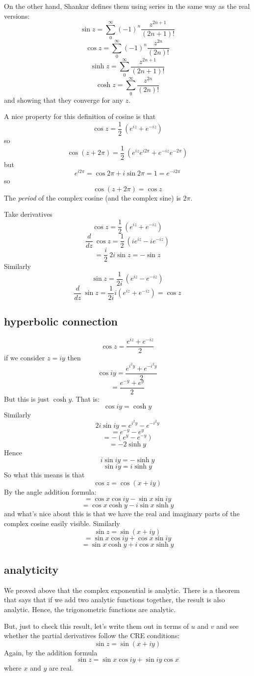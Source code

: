 \documentclass[11pt, oneside]{article}   	%
\begin{document}
On the other hand, Shankar defines them using series in the same way as the real versions:
\[ \sin z = \sum_0^{\infty} (-1)^n \frac{z^{2n+1}}{(2n +1)!} \]
\[ \cos z = \sum_0^{\infty} (-1)^n \frac{z^{2n}}{(2n)!} \]
\[ \sinh z = \sum_0^{\infty} \frac{z^{2n+1}}{(2n +1)!} \]
\[ \cosh z = \sum_0^{\infty} \frac{z^{2n}}{(2n)!} \]
and showing that they converge for any $z$.

A nice property for this definition of cosine is that
\[ \cos z = \frac{1}{2} \ (e^{iz} + e^{-iz}) \]
so
\[ \cos (z + 2\pi) = \frac{1}{2} \ (e^{iz}e^{i2\pi} + e^{-iz}e^{-2\pi}) \]
but
\[ e^{i 2 \pi} = \cos 2 \pi + i \sin 2 \pi = 1 = e^{-i 2 \pi} \]
so
\[ \cos (z + 2\pi) = \cos z \]
The \emph{period} of the complex cosine (and the complex sine) is $2 \pi$.

Take derivatives
\[ \cos z = \frac{1}{2} \ (e^{iz} + e^{-iz} ) \]
\[ \frac{d}{dz} \ \cos z = \frac{1}{2} \ (i e^{iz} - i e^{-iz} ) \]
\[ = \frac{i}{2} \ 2i \sin z = -\sin z \]
Similarly
\[ \sin z = \frac{1}{2i} \ (e^{iz} - e^{-iz}) \]
\[ \frac{d}{dz} \ \sin z = \frac{1}{2i} i (e^{iz} + e^{-iz}) = \cos z \]
\subsection*{hyperbolic connection}
\[ \cos z = \frac{e^{iz} + e^{-iz}}{2} \]
if we consider $z = iy$ then
\[ \cos iy = \frac{e^{i^2y} + e^{-i^2y}}{2} \]
\[ = \frac{e^{-y} + e^{y}}{2} \]
But this is just $\cosh y$.  That is:
\[ \cos iy = \cosh y \]
Similarly
\[ 2i \sin iy = e^{i^2y} - e^{-i^2y} \]
\[ = e^{-y} - e^{y} \]
\[ = - (e^y - e^{-y}) \]
\[ = -2 \sinh y \]
Hence 
\[ i \sin i y = -\sinh y \]
\[ \sin i y =  i \sinh y \]
So what this means is that
\[ \cos z = \cos (x + iy) \]
By the angle addition formula:
\[ = \cos x \cos i y - \sin x \sin i y \]
\[ = \cos x \cosh y - i \sin x \sinh y \]
and what's nice about this is that we have the real and imaginary parts of the complex cosine easily visible.  Similarly
\[ \sin z = \sin(x + iy) \]
\[ = \sin x \cos iy + \cos x \sin iy \]
\[ = \sin x \cosh y + i \cos x \sinh y \]

\subsection*{analyticity}
We proved above that the complex exponential is analytic.  There is a theorem that says that if we add two analytic functions together, the result is also analytic.  Hence, the trigonometric functions are analytic.

But, just to check this result, let's write them out in terms of $u$ and $v$ and see whether the partial derivatives follow the CRE conditions:
\[ \sin z = \sin(x + iy) \]
Again, by the addition formula
\[ \sin z = \sin x \cos iy + \sin iy \cos x \]
where $x$ and $y$ are real.
\end{document}

